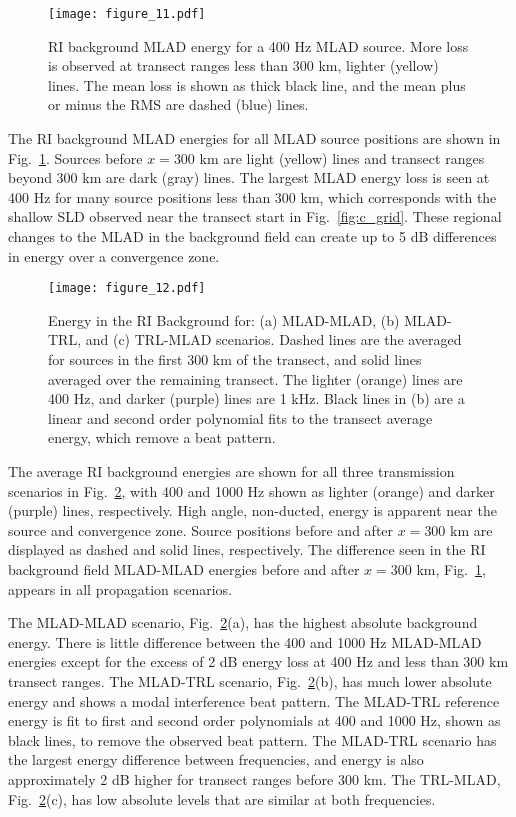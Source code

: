 \documentclass[preprint,NumberedRefs]{JASA}
\begin{document}
\begin{figure}
\texttt{[image: figure\_11.pdf]}
    \caption{RI background MLAD energy for a 400 Hz MLAD source. More loss is observed at transect ranges less than 300 km, lighter (yellow) lines. The mean loss is shown as thick black line, and the mean plus or minus the RMS are dashed (blue) lines.}
    \label{fig:bg_eng}
\end{figure}
The RI background MLAD energies for all MLAD source positions are shown in Fig.~\ref{fig:bg_eng}. Sources before $x=$300 km are light (yellow) lines and transect ranges beyond 300 km are dark (gray) lines. The largest MLAD energy loss is seen at 400 Hz for many source positions less than 300 km, which corresponds with the shallow SLD observed near the transect start in Fig.~\ref{fig:c_grid}. These regional changes to the MLAD in the background field can create up to 5 dB differences in energy over a convergence zone.

\begin{figure}
\texttt{[image: figure\_12.pdf]}
        \caption{Energy in the RI Background for: (a) MLAD-MLAD, (b) MLAD-TRL, and (c) TRL-MLAD scenarios. Dashed lines are the averaged for sources in the first 300 km of the transect, and solid lines averaged over the remaining transect. The lighter (orange) lines are 400 Hz, and darker (purple) lines are 1 kHz. Black lines in (b) are a linear and second order polynomial fits to the transect average energy, which remove a beat pattern.}
    \label{fig:eng_bg_3}
\end{figure}
The average RI background energies are shown for all three transmission scenarios in Fig.~\ref{fig:eng_bg_3}, with 400 and 1000 Hz shown as lighter (orange) and darker (purple) lines, respectively. High angle, non-ducted, energy is apparent near the source and convergence zone. Source positions before and after $x=300$ km are displayed as dashed and solid lines, respectively. The difference seen in the RI background field MLAD-MLAD energies before and after $x=300$ km, Fig.~\ref{fig:bg_eng}, appears in all propagation scenarios.

The MLAD-MLAD scenario, Fig.~\ref{fig:eng_bg_3}(a), has the highest absolute background energy. There is little difference between the 400 and 1000 Hz MLAD-MLAD energies except for the excess of 2 dB energy loss at 400 Hz and less than 300 km transect ranges. The MLAD-TRL scenario, Fig.~\ref{fig:eng_bg_3}(b), has much lower absolute energy and shows a modal interference beat pattern. The MLAD-TRL reference energy is fit to first and second order polynomials at 400 and 1000 Hz, shown as black lines, to remove the observed beat pattern. The MLAD-TRL scenario has the largest energy difference between frequencies, and energy is also approximately 2 dB higher for transect ranges before 300 km. The TRL-MLAD, Fig.~\ref{fig:eng_bg_3}(c), has low absolute levels that are similar at both frequencies.
\end{document}
